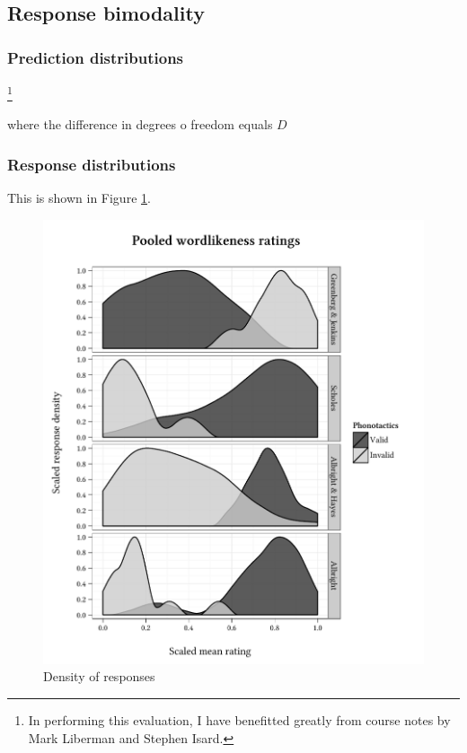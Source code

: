 \subsection{Response bimodality}

\subsubsection{Prediction distributions}



\citet{EM}

\footnote{In performing this evaluation, I have benefitted greatly from course notes by Mark Liberman and Stephen Isard.}


where the difference in degrees o freedom equals $D$


\subsubsection{Response distributions}

This is shown in Figure \ref{density}.

\begin{figure}
\centering
\includegraphics{density.pdf}
\caption{Density of responses}
\label{density}
\end{figure}

